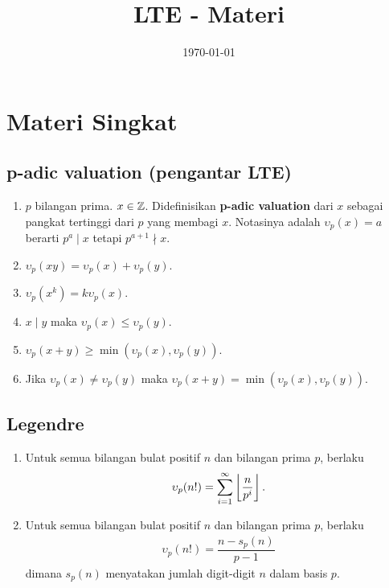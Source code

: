 \documentclass[12pt]{scrartcl}
\title{LTE - Materi}
\date{\today}
\begin{document}
\maketitle

\renewcommand*\contentsname{Daftar Isi}
\tableofcontents

\newpage

\section{Materi Singkat}
\subsection{p-adic valuation (pengantar LTE)}
\begin{enumerate}
    \item $p$ bilangan prima. $x \in \mathbb Z$. Didefinisikan \textbf{p-adic valuation} dari $x$ sebagai pangkat tertinggi dari $p$ yang membagi $x$. Notasinya adalah $\upsilon_p(x)=a$ berarti $p^a \mid x$ tetapi $p^{a+1} \nmid x$.
    \item $\upsilon_p(xy) = \upsilon_p(x) + \upsilon_p(y)$.
    \item $\upsilon_p(x^k)=k\upsilon_p(x)$.
    \item $x \mid y$ maka $\upsilon_p(x) \le \upsilon_p(y)$.
    \item $\upsilon_p(x+y) \ge \min(\upsilon_p(x),\upsilon_p(y))$.
    \item Jika $\upsilon_p(x) \neq \upsilon_p(y)$ maka $\upsilon_p(x+y) = \min(\upsilon_p(x),\upsilon_p(y))$.
\end{enumerate}

\subsection{Legendre}
\begin{enumerate}
    \item Untuk semua bilangan bulat positif $n$ dan bilangan prima $p$, berlaku
\begin{align*}
    \upsilon_p(n!) = \sum_{i=1}^{\infty} \left\lfloor \frac{n}{p^i} \right\rfloor.
\end{align*}

    \item Untuk semua bilangan bulat positif $n$ dan bilangan prima $p$, berlaku
\begin{align*}
    \upsilon_p(n!) = \dfrac{n-s_p(n)}{p-1}
\end{align*}
    dimana $s_p(n)$ menyatakan jumlah digit-digit $n$ dalam basis $p$.
\end{enumerate}
\end{document}
